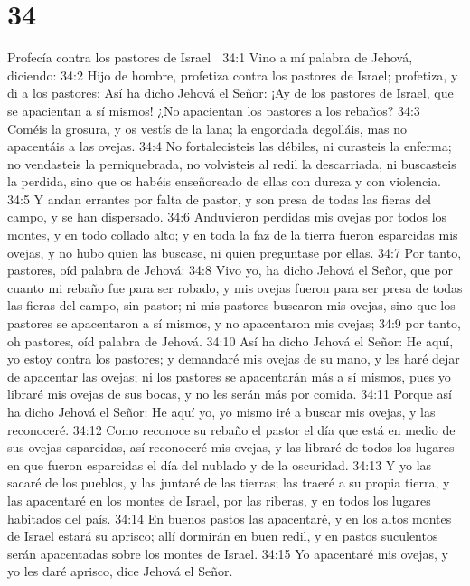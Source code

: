 \chapter{34}

Profecía contra los pastores de Israel 

34:1 Vino a mí palabra de Jehová, diciendo:  
34:2 Hijo de hombre, profetiza contra los pastores de Israel; profetiza, y di a los pastores: Así ha dicho Jehová el Señor: ¡Ay de los pastores de Israel, que se apacientan a sí mismos! ¿No apacientan los pastores a los rebaños?  
34:3 Coméis la grosura, y os vestís de la lana; la engordada degolláis, mas no apacentáis a las ovejas.  
34:4 No fortalecisteis las débiles, ni curasteis la enferma; no vendasteis la perniquebrada, no volvisteis al redil la descarriada, ni buscasteis la perdida, sino que os habéis enseñoreado de ellas con dureza y con violencia.  
34:5 Y andan errantes por falta de pastor, y son presa de todas las fieras del campo, y se han dispersado.  
34:6 Anduvieron perdidas mis ovejas por todos los montes, y en todo collado alto; y en toda la faz de la tierra fueron esparcidas mis ovejas, y no hubo quien las buscase, ni quien preguntase por ellas.  
34:7 Por tanto, pastores, oíd palabra de Jehová:  
34:8 Vivo yo, ha dicho Jehová el Señor, que por cuanto mi rebaño fue para ser robado, y mis ovejas fueron para ser presa de todas las fieras del campo, sin pastor; ni mis pastores buscaron mis ovejas, sino que los pastores se apacentaron a sí mismos, y no apacentaron mis ovejas;  
34:9 por tanto, oh pastores, oíd palabra de Jehová.  
34:10 Así ha dicho Jehová el Señor: He aquí, yo estoy contra los pastores; y demandaré mis ovejas de su mano, y les haré dejar de apacentar las ovejas; ni los pastores se apacentarán más a sí mismos, pues yo libraré mis ovejas de sus bocas, y no les serán más por comida.  
34:11 Porque así ha dicho Jehová el Señor: He aquí yo, yo mismo iré a buscar mis ovejas, y las reconoceré.  
34:12 Como reconoce su rebaño el pastor el día que está en medio de sus ovejas esparcidas, así reconoceré mis ovejas, y las libraré de todos los lugares en que fueron esparcidas el día del nublado y de la oscuridad.  
34:13 Y yo las sacaré de los pueblos, y las juntaré de las tierras; las traeré a su propia tierra, y las apacentaré en los montes de Israel, por las riberas, y en todos los lugares habitados del país.  
34:14 En buenos pastos las apacentaré, y en los altos montes de Israel estará su aprisco; allí dormirán en buen redil, y en pastos suculentos serán apacentadas sobre los montes de Israel.  
34:15 Yo apacentaré mis ovejas, y yo les daré aprisco, dice Jehová el Señor.  
